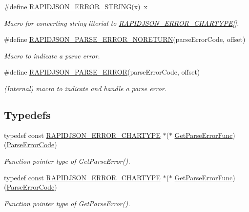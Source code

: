 \begin{DoxyCompactItemize}
\#define \hyperlink{group__RAPIDJSON__ERRORS_gabe2e1bd1349e5a7d6c1af78c05a98f0d}{R\+A\+P\+I\+D\+J\+S\+O\+N\+\_\+\+E\+R\+R\+O\+R\+\_\+\+S\+T\+R\+I\+NG}(x)~x
\begin{DoxyCompactList}\small\item\em Macro for converting string literial to \hyperlink{group__RAPIDJSON__ERRORS_ga7e4636fd48d0148f102b8a13f0539d8c}{R\+A\+P\+I\+D\+J\+S\+O\+N\+\_\+\+E\+R\+R\+O\+R\+\_\+\+C\+H\+A\+R\+T\+Y\+PE}\mbox{[}\mbox{]}. \end{DoxyCompactList}\item 
\#define \hyperlink{group__RAPIDJSON__ERRORS_ga7f8c4265b2edda78568ae3338aaf1461}{R\+A\+P\+I\+D\+J\+S\+O\+N\+\_\+\+P\+A\+R\+S\+E\+\_\+\+E\+R\+R\+O\+R\+\_\+\+N\+O\+R\+E\+T\+U\+RN}(parse\+Error\+Code,  offset)
\begin{DoxyCompactList}\small\item\em Macro to indicate a parse error. \end{DoxyCompactList}\item 
\#define \hyperlink{group__RAPIDJSON__ERRORS_gae3689840fa6e89a241313f33b602f865}{R\+A\+P\+I\+D\+J\+S\+O\+N\+\_\+\+P\+A\+R\+S\+E\+\_\+\+E\+R\+R\+OR}(parse\+Error\+Code,  offset)
\begin{DoxyCompactList}\small\item\em (Internal) macro to indicate and handle a parse error. \end{DoxyCompactList}\end{DoxyCompactItemize}
\subsection*{Typedefs}
\begin{DoxyCompactItemize}
\item 
typedef const \hyperlink{group__RAPIDJSON__ERRORS_ga7e4636fd48d0148f102b8a13f0539d8c}{R\+A\+P\+I\+D\+J\+S\+O\+N\+\_\+\+E\+R\+R\+O\+R\+\_\+\+C\+H\+A\+R\+T\+Y\+PE} $\ast$($\ast$ \hyperlink{group__RAPIDJSON__ERRORS_ga586548166441ab3ce30219cb35be2e04}{Get\+Parse\+Error\+Func}) (\hyperlink{group__RAPIDJSON__ERRORS_ga8d4b32dfc45840bca189ade2bbcb6ba7}{Parse\+Error\+Code})
\begin{DoxyCompactList}\small\item\em Function pointer type of Get\+Parse\+Error(). \end{DoxyCompactList}\item 
typedef const \hyperlink{group__RAPIDJSON__ERRORS_ga7e4636fd48d0148f102b8a13f0539d8c}{R\+A\+P\+I\+D\+J\+S\+O\+N\+\_\+\+E\+R\+R\+O\+R\+\_\+\+C\+H\+A\+R\+T\+Y\+PE} $\ast$($\ast$ \hyperlink{group__RAPIDJSON__ERRORS_ga586548166441ab3ce30219cb35be2e04}{Get\+Parse\+Error\+Func}) (\hyperlink{group__RAPIDJSON__ERRORS_ga8d4b32dfc45840bca189ade2bbcb6ba7}{Parse\+Error\+Code})
\begin{DoxyCompactList}\small\item\em Function pointer type of Get\+Parse\+Error(). \end{DoxyCompactList}\end{DoxyCompactItemize}
